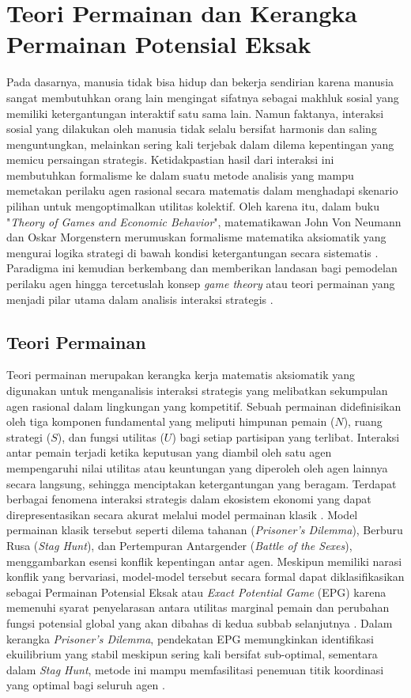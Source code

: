 \section{Teori Permainan dan Kerangka Permainan Potensial Eksak}
\label{sec:2_3_formalime_EPG}
Pada dasarnya, manusia tidak bisa hidup dan bekerja sendirian karena manusia sangat membutuhkan orang lain mengingat sifatnya sebagai makhluk sosial yang memiliki ketergantungan interaktif satu sama lain. Namun faktanya, interaksi sosial yang dilakukan oleh manusia tidak selalu bersifat harmonis dan saling menguntungkan, melainkan sering kali terjebak dalam dilema kepentingan yang memicu persaingan strategis. Ketidakpastian hasil dari interaksi ini membutuhkan formalisme ke dalam suatu metode analisis yang mampu memetakan perilaku agen rasional secara matematis dalam menghadapi skenario pilihan untuk mengoptimalkan utilitas kolektif. Oleh karena itu, dalam buku "\textit{Theory of Games and Economic Behavior}", matematikawan John Von Neumann dan Oskar Morgenstern merumuskan formalisme matematika aksiomatik yang mengurai logika strategi di bawah kondisi ketergantungan secara sistematis \cite{john_von_neumann_theory_1953}. Paradigma ini kemudian berkembang dan memberikan landasan bagi pemodelan perilaku agen hingga tercetuslah konsep \textit{game theory} atau teori permainan yang menjadi pilar utama dalam analisis interaksi strategis \cite{galam_ising_2010}.   

\subsection{Teori Permainan}
Teori permainan merupakan kerangka kerja matematis aksiomatik yang digunakan untuk menganalisis interaksi strategis yang melibatkan sekumpulan agen rasional dalam lingkungan yang kompetitif. Sebuah permainan didefinisikan oleh tiga komponen fundamental yang meliputi himpunan pemain ($N$), ruang strategi ($S$), dan fungsi utilitas ($U$) bagi setiap partisipan yang terlibat. Interaksi antar pemain terjadi ketika keputusan yang diambil oleh satu agen mempengaruhi nilai utilitas atau keuntungan yang diperoleh oleh agen lainnya secara langsung, sehingga menciptakan ketergantungan yang beragam. Terdapat berbagai fenomena interaksi strategis dalam ekosistem ekonomi yang dapat direpresentasikan secara akurat melalui model permainan klasik \cite{monderer_potential_1996}. Model permainan klasik tersebut seperti dilema tahanan (\textit{Prisoner's Dilemma}), Berburu Rusa (\textit{Stag Hunt}), dan Pertempuran Antargender (\textit{Battle of the Sexes}), menggambarkan esensi konflik kepentingan antar agen. Meskipun memiliki narasi konflik yang bervariasi, model-model tersebut secara formal dapat diklasifikasikan sebagai Permainan Potensial Eksak atau \textit{Exact Potential Game} (EPG) karena memenuhi syarat penyelarasan antara utilitas marginal pemain dan perubahan fungsi potensial global yang akan dibahas di kedua subbab selanjutnya \cite{monderer_potential_1996}. Dalam kerangka \textit{Prisoner's Dilemma}, pendekatan EPG memungkinkan identifikasi ekuilibrium yang stabil meskipun sering kali bersifat sub-optimal, sementara dalam \textit{Stag Hunt}, metode ini mampu memfasilitasi penemuan titik koordinasi yang optimal bagi seluruh agen \cite{sarkar_quantum_2018}.


